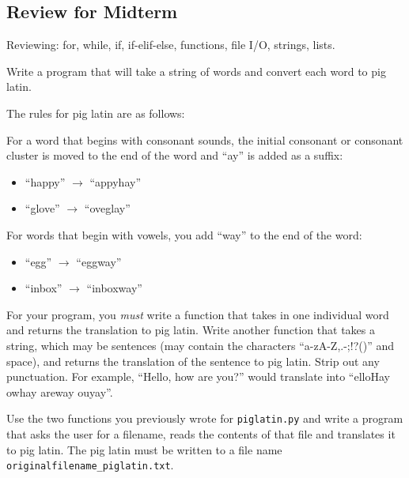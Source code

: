 \documentclass[11pt]{cselabheader}
\begin{document}
\subsection{Review for Midterm}
\label{subsec:reviewex}

Reviewing: for, while, if, if-elif-else, functions, file I/O, strings, lists. 

\begin{ex}[piglatin.py] Write a program that will take a string of words and
    convert each word to pig latin. 

    The rules for pig latin are as follows:

    For a word that begins with consonant sounds, the initial consonant or
    consonant cluster is moved to the end of the word and ``ay'' is added as a
    suffix:
    \begin{itemize}
      \item ``happy'' $\to$ ``appyhay''
      \item ``glove'' $\to$ ``oveglay''
    \end{itemize}

    For words that begin with vowels, you add ``way'' to the end of the word:
    \begin{itemize}
      \item ``egg'' $\to$ ``eggway''
      \item ``inbox'' $\to$ ``inboxway''
    \end{itemize}

    For your program, you \emph{must} write a function that takes in one
    individual word and returns the translation to pig latin. Write another
    function that takes a string, which may be sentences (may contain the
    characters ``a-zA-Z,.-;!?()'' and space), and returns the translation of the
    sentence to pig latin. Strip out any punctuation. For example, ``Hello, how
    are you?'' would translate into ``elloHay owhay areway ouyay''.
\end{ex}

\begin{ex} Use the two functions you previously wrote for
    \texttt{piglatin.py} and write a program that asks the user for a filename,
    reads the contents of that file and translates it to pig latin. The pig
    latin must be written to a file name
    \texttt{originalfilename\_piglatin.txt}.
  \end{ex}
\end{document}
